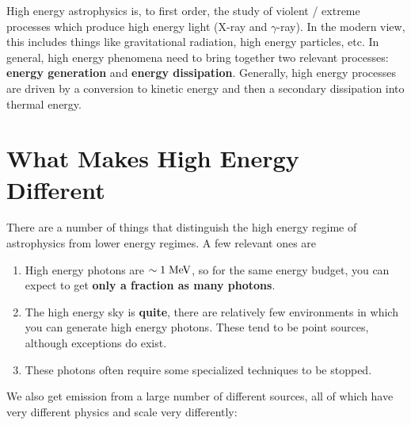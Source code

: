 High energy astrophysics is, to first order, the study of violent / extreme processes which produce high energy light (X-ray and $\gamma$-ray). In the modern view, this includes things like gravitational radiation, high energy particles, etc. In general, high energy phenomena need to bring together two relevant processes: \textbf{energy generation} and \textbf{energy dissipation}. Generally, high energy processes are driven by a conversion to kinetic energy and then a secondary dissipation into thermal energy.

\section{What Makes High Energy Different}

There are a number of things that distinguish the high energy regime of astrophysics from lower energy regimes. A few relevant ones are
\vspace{0.5cm}
\begin{enumerate}
    \item High energy photons are $\sim 1\; \rm{MeV}$, so for the same energy budget, you can expect to get \textbf{only a fraction as many photons}.
    \item The high energy sky is \textbf{quite}, there are relatively few environments in which you can generate high energy photons. These tend to be point sources,
    although exceptions do exist.
    \item These photons often require some specialized techniques to be stopped.
\end{enumerate}

We also get emission from a large number of different sources, all of which have very different physics and scale very differently:

